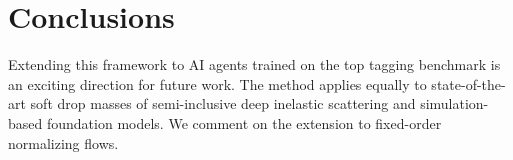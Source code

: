 \section{Conclusions}\label{sec:conclusions}

Extending this framework to AI agents trained on the top tagging
benchmark is an exciting direction for future work. The method applies
equally to state-of-the-art soft drop masses of semi-inclusive deep
inelastic scattering and simulation-based foundation models. We comment
on the extension to fixed-order normalizing flows.

